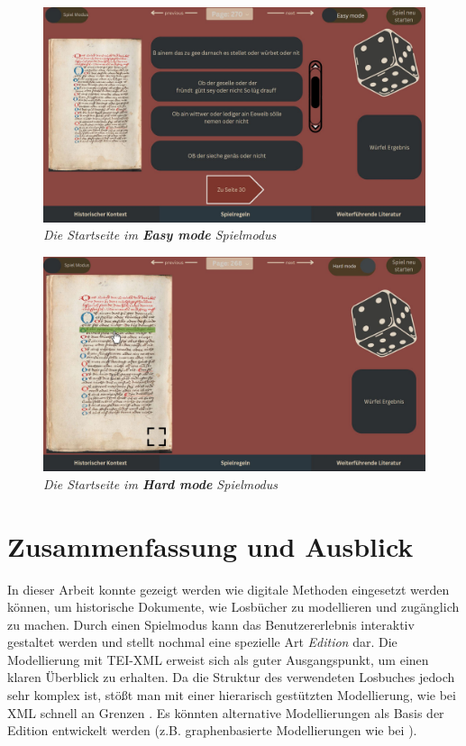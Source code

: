 \documentclass[12pt,a4paper]{article}
\begin{document}
			\begin{figure}[H]
				\centering
				\includegraphics[scale=0.3]{ansicht-gamemodus-easy.JPG}
				\caption{\textit{Die Startseite im \textbf{Easy mode} Spielmodus}}
				\label{Abbildung5}
			\end{figure}
			\begin{figure}[H]
				\label{Abbildung6}
				\centering
				\includegraphics[scale=0.3]{ansicht-gamemodus-hard.JPG}
				\caption{\textit{Die Startseite im \textbf{Hard mode} Spielmodus}}
			\end{figure}

\section{Zusammenfassung und Ausblick}
	In dieser Arbeit konnte gezeigt werden wie digitale Methoden eingesetzt werden können, um historische Dokumente, wie Losbücher zu modellieren und zugänglich zu machen.
	Durch einen Spielmodus kann das Benutzererlebnis interaktiv gestaltet werden und stellt nochmal eine spezielle Art \textit{Edition} dar.
	Die Modellierung mit TEI-XML erweist sich als guter Ausgangspunkt, um einen klaren Überblick zu erhalten. Da die Struktur des verwendeten Losbuches jedoch sehr komplex ist,
	stößt man mit einer hierarisch gestützten Modellierung, wie bei XML schnell an Grenzen \parencite[S.~8]{cugliana}. Es könnten alternative Modellierungen als Basis der Edition entwickelt 
	werden (z.B. graphenbasierte Modellierungen wie bei \cite{cugliana}).


\printbibliography
\end{document}

